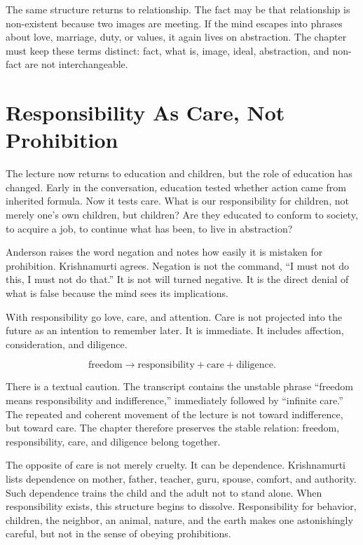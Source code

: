 The same structure returns to relationship. The fact may be that relationship is non-existent because two images are meeting. If the mind escapes into phrases about love, marriage, duty, or values, it again lives on abstraction. The chapter must keep these terms distinct: fact, what is, image, ideal, abstraction, and non-fact are not interchangeable.

\section{Responsibility As Care, Not Prohibition}

The lecture now returns to education and children, but the role of education has changed. Early in the conversation, education tested whether action came from inherited formula. Now it tests care. What is our responsibility for children, not merely one's own children, but children? Are they educated to conform to society, to acquire a job, to continue what has been, to live in abstraction?

Anderson raises the word negation and notes how easily it is mistaken for prohibition. Krishnamurti agrees. Negation is not the command, ``I must not do this, I must not do that.'' It is not will turned negative. It is the direct denial of what is false because the mind sees its implications.

With responsibility go love, care, and attention. Care is not projected into the future as an intention to remember later. It is immediate. It includes affection, consideration, and diligence.

\begin{equation}
\text{freedom}
\longrightarrow
\text{responsibility}+\text{care}+\text{diligence}.
\end{equation}

There is a textual caution. The transcript contains the unstable phrase ``freedom means responsibility and indifference,'' immediately followed by ``infinite care.'' The repeated and coherent movement of the lecture is not toward indifference, but toward care. The chapter therefore preserves the stable relation: freedom, responsibility, care, and diligence belong together.

The opposite of care is not merely cruelty. It can be dependence. Krishnamurti lists dependence on mother, father, teacher, guru, spouse, comfort, and authority. Such dependence trains the child and the adult not to stand alone. When responsibility exists, this structure begins to dissolve. Responsibility for behavior, children, the neighbor, an animal, nature, and the earth makes one astonishingly careful, but not in the sense of obeying prohibitions.

